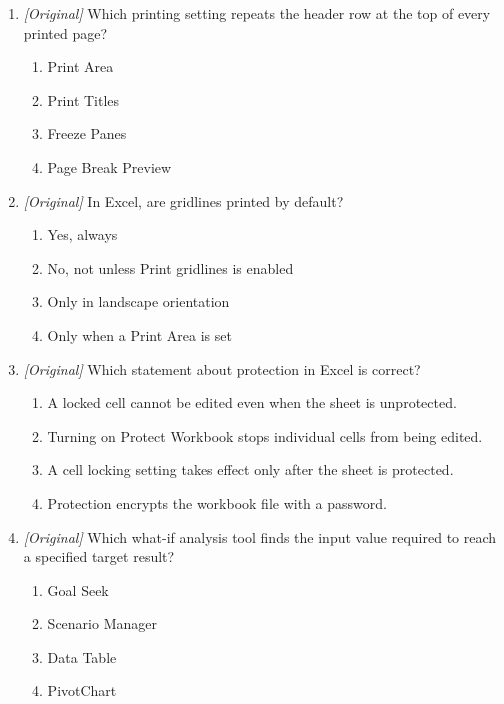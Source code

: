 \documentclass[11pt]{article}
\begin{document}
\begin{enumerate}[label=\textbf{Q\arabic*.}, leftmargin=*]
\begin{enumerate}[label=\Alph*.]
    \item Both functions can apply only OR logic.
  \end{enumerate}
\item \textit{[Original]} Which printing setting repeats the header row at the
  top of every printed page?
  \begin{enumerate}[label=\Alph*.]
    \item Print Area
    \item Print Titles
    \item Freeze Panes
    \item Page Break Preview
  \end{enumerate}
\item \textit{[Original]} In Excel, are gridlines printed by default?
  \begin{enumerate}[label=\Alph*.]
    \item Yes, always
    \item No, not unless Print gridlines is enabled
    \item Only in landscape orientation
    \item Only when a Print Area is set
  \end{enumerate}
\item \textit{[Original]} Which statement about protection in Excel is correct?
  \begin{enumerate}[label=\Alph*.]
    \item A locked cell cannot be edited even when the sheet is unprotected.
    \item Turning on Protect Workbook stops individual cells from being edited.
    \item A cell locking setting takes effect only after the sheet is
      protected.
    \item Protection encrypts the workbook file with a password.
  \end{enumerate}
\item \textit{[Original]} Which what-if analysis tool finds the input value
  required to reach a specified target result?
  \begin{enumerate}[label=\Alph*.]
    \item Goal Seek
    \item Scenario Manager
    \item Data Table
    \item PivotChart
  \end{enumerate}


\end{enumerate}
\end{document}
